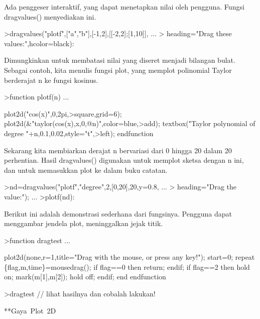 \documentclass[a4paper,10pt]{article}
\begin{document}
\begin{eulernotebook}
\begin{eulercomment}
\begin{eulercomment}
\begin{eulercomment}
\begin{eulercomment}
\begin{eulercomment}
Ada penggeser interaktif, yang dapat menetapkan nilai oleh pengguna.
Fungsi dragvalues() menyediakan ini.
\end{eulercomment}
\begin{eulerprompt}
>dragvalues("plotf",["a","b"],[-1,2],[[-2,2];[1,10]], ...
>  heading="Drag these values:",hcolor=black):
\end{eulerprompt}
\begin{eulercomment}
Dimungkinkan untuk membatasi nilai yang diseret menjadi bilangan
bulat. Sebagai contoh, kita menulis fungsi plot, yang memplot
polinomial Taylor berderajat n ke fungsi kosinus.
\end{eulercomment}
\begin{eulerprompt}
>function plotf(n) ...
\end{eulerprompt}
\begin{eulerudf}
  plot2d("cos(x)",0,2pi,>square,grid=6);
  plot2d(&"taylor(cos(x),x,0,@n)",color=blue,>add);
  textbox("Taylor polynomial of degree "+n,0.1,0.02,style="t",>left);
  endfunction
\end{eulerudf}
\begin{eulercomment}
Sekarang kita membiarkan derajat n bervariasi dari 0 hingga 20 dalam
20 perhentian. Hasil dragvalues() digunakan untuk memplot sketsa
dengan n ini, dan untuk memasukkan plot ke dalam buku catatan.
\end{eulercomment}
\begin{eulerprompt}
>nd=dragvalues("plotf","degree",2,[0,20],20,y=0.8, ...
>   heading="Drag the value:"); ...
>plotf(nd):
\end{eulerprompt}
\begin{eulercomment}
Berikut ini adalah demonstrasi sederhana dari fungsinya. Pengguna
dapat menggambar jendela plot, meninggalkan jejak titik.
\end{eulercomment}
\begin{eulerprompt}
>function dragtest ...
\end{eulerprompt}
\begin{eulerudf}
    plot2d(none,r=1,title="Drag with the mouse, or press any key!");
    start=0;
    repeat
      \{flag,m,time\}=mousedrag();
      if flag==0 then return; endif;
      if flag==2 then
        hold on; mark(m[1],m[2]); hold off;
      endif;
    end
  endfunction
\end{eulerudf}
\begin{eulerprompt}
>dragtest // lihat hasilnya dan cobalah lakukan!
\end{eulerprompt}
\begin{eulercomment}
**Gaya Plot 2D


\end{eulercomment}
\end{eulercomment}
\end{eulercomment}
\end{eulercomment}
\end{eulercomment}
\end{eulernotebook}
\end{document}
